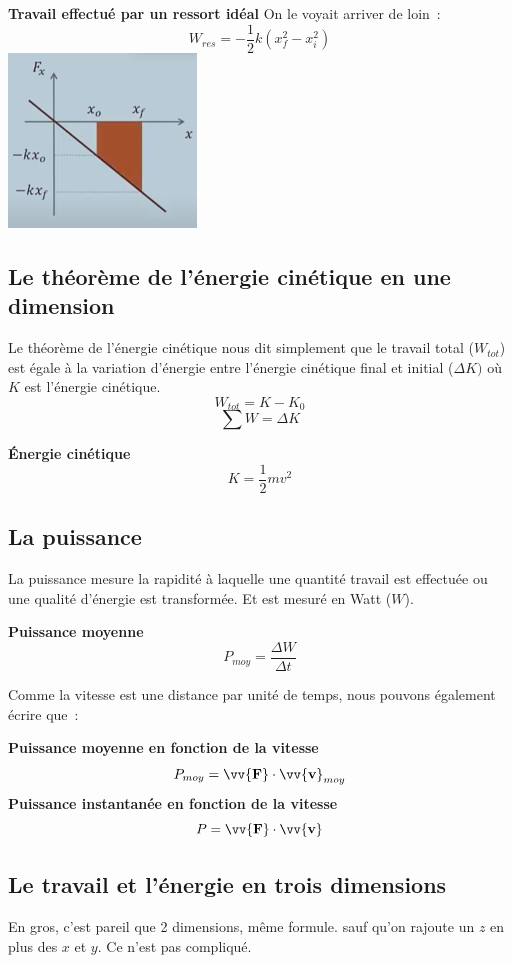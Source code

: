 \documentclass{article}
\begin{document}
\noindent
\textbf{Travail effectué par un ressort idéal}
On le voyait arriver de loin :
\[W_{res} = -\frac{1}{2}k(x^2_f - x^2_i)\]
 \includegraphics[width=5cm]{Image/RessortWork.png}
 
 \subsection{Le théorème de l'énergie cinétique en une dimension}
 Le théorème de l'énergie cinétique nous dit simplement que le travail total ($W_{tot}$) est égale à la variation d'énergie entre l'énergie cinétique final et initial ($\Delta K)$ où $K$ est l'énergie cinétique.
\[W_{tot} = K - K_0\]
\[\sum W = \Delta K\]
\newline

\noindent
\textbf{Énergie cinétique}
\[K = \frac{1}{2}mv^2\]

\subsection{La puissance}
La puissance mesure la rapidité à laquelle une quantité travail est effectuée ou une qualité d'énergie est transformée. Et est mesuré en Watt ($W$).
\newline

\noindent
\textbf{Puissance moyenne}
\[P_{moy} = \frac{\Delta W}{\Delta t}\]
\newline

\noindent
Comme la vitesse est une distance par unité de temps, nous pouvons également écrire que :
\newline

\noindent
\textbf{Puissance moyenne en fonction de la vitesse}
\[P_{moy} = \vv{\mathbf{F}}\cdot\vv{\mathbf{v}}_{moy}\]
\newline
\textbf{Puissance instantanée en fonction de la vitesse}
\[P = \vv{\mathbf{F}}\cdot\vv{\mathbf{v}}\]
\newline

\subsection{Le travail et l'énergie en trois dimensions}
En gros, c'est pareil que 2 dimensions, même formule. sauf qu'on rajoute un $z$ en plus des $x$ et $y$. Ce n'est pas compliqué.
\end{document}
